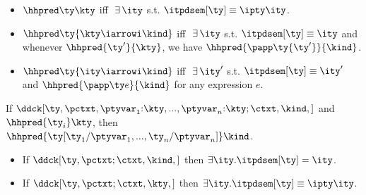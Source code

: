 \begin{definition}
\label{def:pd-props}
\begin{itemize}
\item $\hhpred \ty \kty$ iff $\ \exists\,\ity$ s.t. $\itpdsem[\ty] \equiv
  {\ipty \ity}$.
\item $\hhpred \ty {\kty \iarrowi \kind}$ iff $\ \exists\,\ity$
  s.t. $\itpdsem[\ty] \equiv \ity$ and whenever $\hhpred
  {\ty'}{\kty}$, we have $\hhpred {\papp \ty {\ty'}}{\kind}$.
\item $\hhpred \ty {\ity \iarrowi \kind}$ iff $\ \exists\,\ity'$
  s.t. $\itpdsem[\ty] \equiv \ity'$ and $\hhpred{\papp \ty e}{\kind}$
  for any expression $e$.
\end{itemize}
\end{definition}
\begin{lemma}
\label{lemma:pd-log-rel}
   If
   $\ddck[\ty,{\pctxt,\ptyvar_1{:}\kty,...,\ptyvar_n{:}\kty;\ctxt},\kind,{}]$ 
   and $\hhpred {\ty_i} \kty$, then \\ 
   $\hhpred {\ty[\ty_1/\ptyvar_1,...,\ty_n/\ptyvar_n]} \kind$.
\end{lemma}

\begin{lemma}
\label{lemma:pd-props}
  \begin{itemize}
  \item If $\ddck[\ty,\pctxt;\ctxt,\kind,{}]$ then $\exists
     \ity.\itpdsem[\ty] = \ity$.
   \item If $\ddck[\ty,\pctxt;\ctxt,\kty,{}]$ then $\exists
     \ity.\itpdsem[\ty] \equiv \ipty \ity$.
  \end{itemize}
\end{lemma}


